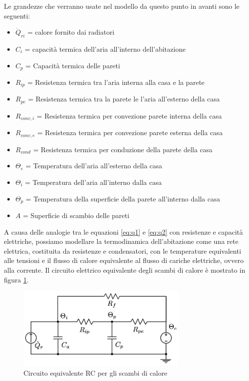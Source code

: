 \documentclass[laurea,oneside,11pt]{USiena_tesiLM}
\begin{document}
Le grandezze che verranno usate nel modello da questo punto in avanti sono le seguenti:
\begin{itemize}
\item[] $\dot{Q}_{ri}$ = calore fornito dai radiatori
\item[]$C_i$ = capacità termica dell'aria all'interno dell'abitazione
\item[]$C_p$ = Capacità termica delle pareti
\item[]$R_{ip}$ = Resistenza termica tra l'aria interna alla casa e la parete
\item[]$R_{pe}$ = Resistenza termica tra la parete le l'aria all'esterno della casa
\item[]$R_{conv,i}$ = Resistenza termica per convezione   parete interna della casa
\item[]$R_{conv,e}$ = Resistenza termica per convezione  parete esterna della casa
\item[]$R_{cond}$ = Resistenza termica per conduzione della parete della casa
\item[]$\Theta_{e}$ = Temperatura dell'aria all'esterno della casa
\item[]$\Theta_i$ = Temperatura dell'aria all'interno dalla casa
\item[]$\Theta_p$ = Temperatura della superficie della parete all'interno dalla casa 
\item[]$A$ = Superficie di scambio delle pareti
\end{itemize}


A causa delle analogie tra le equazioni \ref{eq:q1} e \ref{eq:q2} con resistenze e capacità elettriche, possiamo modellare la termodinamica dell'abitazione come una rete elettrica, costituita da resistenze e condensatori, con le temperature equivalenti alle tensioni e il flusso di calore equivalente al flusso di cariche elettriche, ovvero alla corrente. Il circuito elettrico equivalente degli scambi di calore è mostrato in figura \ref{fig:RC}.

\begin{figure}[h]
\begin{center}
\includegraphics[width=0.75\textwidth]{figure/schema_trasf_calore}
\caption{Circuito equivalente RC per gli scambi di calore}
\label{fig:RC}
\end{center}
\end{figure}
 
\end{document}
